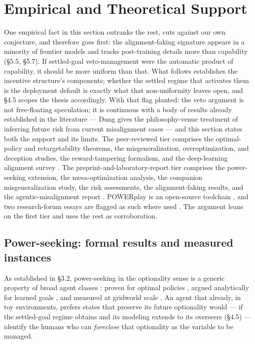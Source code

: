 \documentclass[11pt]{article}
\theoremstyle{definition}
\begin{document}
\section{Empirical and Theoretical Support}

One empirical fact in this section outranks the rest, cuts against our own conjecture, and therefore goes first: the alignment-faking signature appears in a minority of frontier models and tracks post-training details more than capability (\S5.5, \S5.7). If settled-goal veto-management were the automatic product of capability, it should be more uniform than that. What follows establishes the incentive structure's components; whether the settled regime that activates them is the deployment default is exactly what that non-uniformity leaves open, and \S4.5 scopes the thesis accordingly. With that flag planted: the veto argument is not free-floating speculation; it is continuous with a body of results already established in the literature --- Dung gives the philosophy-venue treatment of inferring future risk from current misalignment cases \cite{dung2023current} --- and this section states both the support and its limits. The peer-reviewed tier comprises the optimal-policy and retargetability theorems, the misgeneralization, overoptimization, and deception studies, the reward-tampering formalism, and the deep-learning alignment survey \cite{turner2021optimal,turner2022parametrically,langosco2022goal,gao2023scaling,park2024deception,hagendorff2024deception,everitt2021reward,ngo2024alignment}. The preprint-and-laboratory-report tier comprises the power-seeking extension, the mesa-optimization analysis, the companion misgeneralization study, the risk assessments, the alignment-faking results, and the agentic-misalignment report \cite{krakovna2023probable,hubinger2019risks,shah2022goal,carlsmith2022power,greenblatt2024alignment,sheshadri2025alignment,lynch2025agentic}. POWERplay is an open-source toolchain \cite{harris2022powerplay}, and two research-forum essays are flagged as such where used \cite{turner2022reward,christiano2017corrigibility}. The argument leans on the first tier and uses the rest as corroboration.

\subsection{Power-seeking: formal results and measured instances}

As established in \S3.2, power-seeking in the optionality sense is a generic property of broad agent classes \cite{turner2022parametrically}: proven for optimal policies \cite{turner2021optimal}, argued analytically for learned goals \cite{krakovna2023probable}, and measured at gridworld scale \cite{harris2022powerplay}. An agent that already, in toy environments, prefers states that preserve its future optionality \cite{harris2022powerplay} would --- if the settled-goal regime obtains and its modeling extends to its overseers (\S4.5) --- identify the humans who can \emph{foreclose} that optionality as the variable to be managed.
\end{document}
